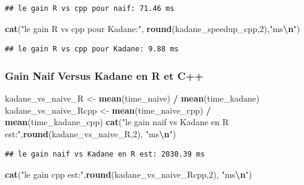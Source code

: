 \documentclass[
]{article}
\newenvironment{Shaded}{\begin{snugshade}}{\end{snugshade}}
\newcommand{\DecValTok}[1]{\textcolor[rgb]{0.00,0.00,0.81}{#1}}
\newcommand{\FunctionTok}[1]{\textcolor[rgb]{0.13,0.29,0.53}{\textbf{#1}}}
\newcommand{\NormalTok}[1]{#1}
\newcommand{\OtherTok}[1]{\textcolor[rgb]{0.56,0.35,0.01}{#1}}
\newcommand{\SpecialCharTok}[1]{\textcolor[rgb]{0.81,0.36,0.00}{\textbf{#1}}}
\newcommand{\StringTok}[1]{\textcolor[rgb]{0.31,0.60,0.02}{#1}}
\begin{document}
\begin{verbatim}
## le gain R vs cpp pour naif: 71.46 ms
\end{verbatim}

\begin{Shaded}
\begin{Highlighting}[]
\FunctionTok{cat}\NormalTok{(}\StringTok{"le gain R vs cpp pour Kadane:"}\NormalTok{, }\FunctionTok{round}\NormalTok{(kadane\_speedup\_cpp,}\DecValTok{2}\NormalTok{),}\StringTok{"ms}\SpecialCharTok{\textbackslash{}n}\StringTok{"}\NormalTok{)}
\end{Highlighting}
\end{Shaded}

\begin{verbatim}
## le gain R vs cpp pour Kadane: 9.88 ms
\end{verbatim}

\subsubsection{Gain Naif Versus Kadane en R et
C++}\label{gain-naif-versus-kadane-en-r-et-c}

\begin{Shaded}
\begin{Highlighting}[]
\NormalTok{kadane\_vs\_naive\_R }\OtherTok{\textless{}{-}} \FunctionTok{mean}\NormalTok{(time\_naive) }\SpecialCharTok{/} \FunctionTok{mean}\NormalTok{(time\_kadane)}
\NormalTok{kadane\_vs\_naive\_Rcpp }\OtherTok{\textless{}{-}} \FunctionTok{mean}\NormalTok{(time\_naive\_cpp) }\SpecialCharTok{/} \FunctionTok{mean}\NormalTok{(time\_kadane\_cpp)}
\FunctionTok{cat}\NormalTok{(}\StringTok{"le gain naif vs Kadane en R est:"}\NormalTok{,}\FunctionTok{round}\NormalTok{(kadane\_vs\_naive\_R,}\DecValTok{2}\NormalTok{), }\StringTok{"ms}\SpecialCharTok{\textbackslash{}n}\StringTok{"}\NormalTok{)}
\end{Highlighting}
\end{Shaded}

\begin{verbatim}
## le gain naif vs Kadane en R est: 2030.39 ms
\end{verbatim}

\begin{Shaded}
\begin{Highlighting}[]
\FunctionTok{cat}\NormalTok{(}\StringTok{"le gain cpp est:"}\NormalTok{,}\FunctionTok{round}\NormalTok{(kadane\_vs\_naive\_Rcpp,}\DecValTok{2}\NormalTok{), }\StringTok{"ms}\SpecialCharTok{\textbackslash{}n}\StringTok{"}\NormalTok{)}
\end{Highlighting}
\end{Shaded}
\end{document}
